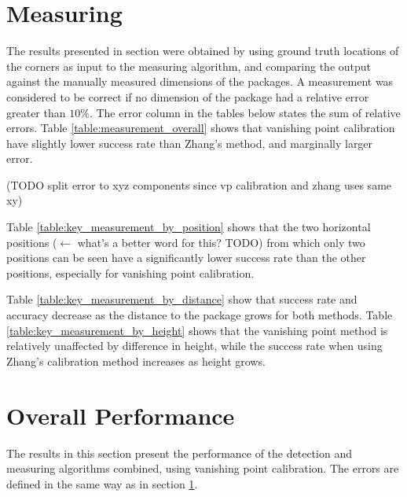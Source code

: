 \section{Measuring} \label{results:measuring} 
The results presented in section were obtained by using ground truth locations of the corners as input to the measuring algorithm, and comparing the output against the manually measured dimensions of the packages.
A measurement was considered to be correct if no dimension of the package had a relative error greater than $10\%$.
The error column in the tables below states the sum of relative errors. 
Table \ref{table:measurement_overall} shows that vanishing point calibration have slightly lower success rate than Zhang's method, and marginally larger error.

(TODO split error to xyz components since vp calibration and zhang uses same xy) %






Table \ref{table:key_measurement_by_position} shows that the two horizontal positions ($\leftarrow$ what's a better word for this? TODO) from which only two positions can be seen have a significantly lower success rate than the other positions, especially for vanishing point calibration. %



Table \ref{table:key_measurement_by_distance} show that success rate and accuracy decrease as the distance to the package grows for both methods. Table \ref{table:key_measurement_by_height} shows that the vanishing point method is relatively unaffected by difference in height, while the success rate when using Zhang's calibration method increases as height grows.




\section{Overall Performance} \label{results:overall}
The results in this section present the performance of the detection and measuring algorithms combined, using vanishing point calibration.
The errors are defined in the same way as in section \ref{results:measuring}.

